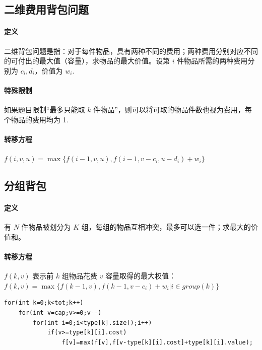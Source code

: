 \subsection{二维费用背包问题}

\paragraph{定义} 二维背包问题是指：对于每件物品，具有两种不同的费用；两种费用分别对应不同的可付出的最大值（容量），求物品的最大价值。设第 $i$ 件物品所需的两种费用分别为 $c_i, d_i$，价值为 $w_i$.
\paragraph{特殊限制} 如果题目限制“最多只能取 $k$ 件物品”，则可以将可取的物品件数也视为费用，每个物品的费用均为 1.
\paragraph{转移方程} $f(i, v, u) = \max\{f(i-1, v, u), f(i-1, v-c_i, u-d_i) + w_i\}$

\subsection{分组背包}
\paragraph{定义} 有 $N$ 件物品被划分为 $K$ 组，每组的物品互相冲突，最多可以选一件；求最大的价值和。
\paragraph{转移方程} $f(k, v)$ 表示前 $k$ 组物品花费 $v$ 容量取得的最大权值：$f(k, v) = \max\{ f(k-1, v), f(k-1, v-c_i) + w_i | i \in group(k) \}$
\begin{verbatim}
for(int k=0;k<tot;k++)
    for(int v=cap;v>=0;v--)
        for(int i=0;i<type[k].size();i++)
            if(v>=type[k][i].cost)
                f[v]=max(f[v],f[v-type[k][i].cost]+type[k][i].value);
\end{verbatim}

\clearpage